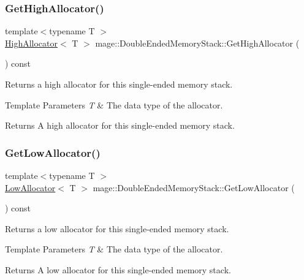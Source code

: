 \subsubsection{\texorpdfstring{Get\+High\+Allocator()}{GetHighAllocator()}}
{\footnotesize\ttfamily template$<$typename T $>$ \\
\mbox{\hyperlink{classmage_1_1_double_ended_memory_stack_1_1_high_allocator}{High\+Allocator}}$<$ T $>$ mage\+::\+Double\+Ended\+Memory\+Stack\+::\+Get\+High\+Allocator (\begin{DoxyParamCaption}{ }\end{DoxyParamCaption}) const\hspace{0.3cm}{\ttfamily [noexcept]}}

Returns a high allocator for this single-\/ended memory stack.


\begin{DoxyTemplParams}{Template Parameters}
{\em T} & The data type of the allocator. \\
\hline
\end{DoxyTemplParams}
\begin{DoxyReturn}{Returns}
A high allocator for this single-\/ended memory stack. 
\end{DoxyReturn}
\mbox{\label{classmage_1_1_double_ended_memory_stack_ada7dfb759df112e0cefccef6f6fc16ee}} 
\subsubsection{\texorpdfstring{Get\+Low\+Allocator()}{GetLowAllocator()}}
{\footnotesize\ttfamily template$<$typename T $>$ \\
\mbox{\hyperlink{classmage_1_1_double_ended_memory_stack_1_1_low_allocator}{Low\+Allocator}}$<$ T $>$ mage\+::\+Double\+Ended\+Memory\+Stack\+::\+Get\+Low\+Allocator (\begin{DoxyParamCaption}{ }\end{DoxyParamCaption}) const\hspace{0.3cm}{\ttfamily [noexcept]}}

Returns a low allocator for this single-\/ended memory stack.


\begin{DoxyTemplParams}{Template Parameters}
{\em T} & The data type of the allocator. \\
\hline
\end{DoxyTemplParams}
\begin{DoxyReturn}{Returns}
A low allocator for this single-\/ended memory stack. 
\end{DoxyReturn}
\mbox{\label{classmage_1_1_double_ended_memory_stack_a68d69d69243d5ef8a9fd12b7d7a42993}} 
